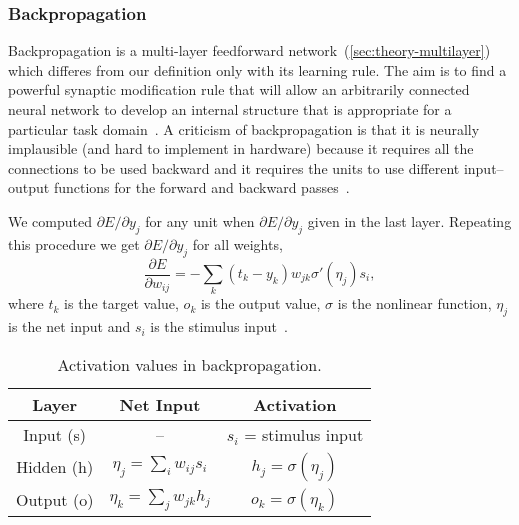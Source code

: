 \subsubsection{Backpropagation}
\label{sec:models-bp} 

Backpropagation is a multi-layer feedforward network~(\ref{sec:theory-multilayer}) which differes from our definition only with its learning rule. The aim is to find a powerful synaptic modification rule that will allow an arbitrarily connected neural network to develop an internal structure that is appropriate for a particular task domain~\citep{rumelhart1986learning}. A criticism of backpropagation is that it is neurally implausible (and hard to implement in hardware) because it requires all the connections to be used backward and it requires the units to use different input--output functions for the forward and backward passes~\citep{hinton1988learning}.

We computed $\partial E / \partial y_j$ for any unit when $\partial E / \partial y_j$ given in the last layer. Repeating this procedure we get $\partial E / \partial y_j$ for all weights, 
\begin{equation} 
\frac{\partial E}{\partial w_{ij}} = -\sum_k(t_k-y_k)w_{jk}\sigma'(\eta_j)s_i,
\end{equation}
where $t_k$ is the target value, $o_k$ is the output value, $\sigma$ is the nonlinear function, $\eta_j$ is the net input and $s_i$ is the stimulus input~\citep{o1996bio}.

\begin{table}[H] 
  \centering
  \begin{tabular}{|ccc|}
    \hline
    Layer & Net Input & Activation\\
    \hline
    Input (s)  & -- & $s_i$ = stimulus input\\
    \hline
    Hidden (h) & \hspace{0.3cm} $\eta_j = \sum_i w_{ij}s_i$ \hspace{0.3cm} &
    $h_j = \sigma(\eta_j)$\hspace{0.3cm}\\
    \hline
    Output (o) & \hspace{0.3cm} $\eta_k = \sum_j w_{jk}h_j$ \hspace{0.3cm} & 
    $o_k = \sigma(\eta_k)$\hspace{0.3cm}\\
    \hline
  \end{tabular}
  \caption{Activation values in backpropagation.}
  \label{tab:models-bp}
\end{table}
